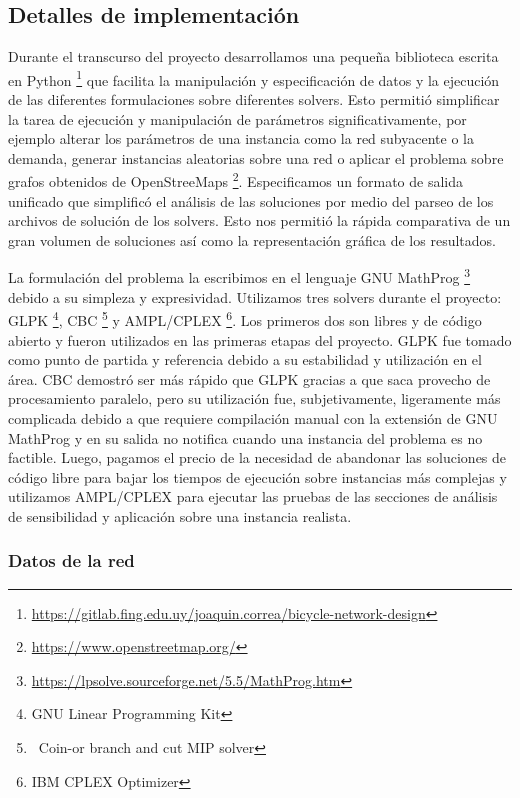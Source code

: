 \documentclass{article}
\begin{document}
  \subsection{Detalles de implementación}

  Durante el transcurso del proyecto desarrollamos una pequeña biblioteca escrita en Python \footnote{\url{https://gitlab.fing.edu.uy/joaquin.correa/bicycle-network-design}} que facilita la manipulación y especificación de datos y la ejecución de las diferentes formulaciones sobre diferentes solvers. Esto permitió simplificar la tarea de ejecución y manipulación de parámetros significativamente, por ejemplo alterar los parámetros de una instancia como la red subyacente o la demanda, generar instancias aleatorias sobre una red o aplicar el problema sobre grafos obtenidos de OpenStreeMaps \footnote{\url{https://www.openstreetmap.org/}}. Especificamos un formato de salida unificado que simplificó el análisis de las soluciones por medio del parseo de los archivos de solución de los solvers. Esto nos permitió la rápida comparativa de un gran volumen de soluciones así como la representación gráfica de los resultados.

  La formulación del problema la escribimos en el lenguaje GNU MathProg \footnote{\url{https://lpsolve.sourceforge.net/5.5/MathProg.htm}} debido a su simpleza y expresividad. Utilizamos tres solvers durante el proyecto: GLPK \footnote{GNU Linear Programming Kit}, CBC \footnote{\ Coin-or branch and cut MIP solver} y AMPL/CPLEX \footnote{IBM CPLEX Optimizer}. Los primeros dos son libres y de código abierto y fueron utilizados en las primeras etapas del proyecto. GLPK fue tomado como punto de partida y referencia debido a su estabilidad y utilización en el área. CBC demostró ser más rápido que GLPK gracias a que saca provecho de procesamiento paralelo, pero su utilización fue, subjetivamente, ligeramente más complicada debido a que requiere compilación manual con la extensión de GNU MathProg y en su salida no notifica cuando una instancia del problema es no factible. Luego, pagamos el precio de la necesidad de abandonar las soluciones de código libre para bajar los tiempos de ejecución sobre instancias más complejas y utilizamos AMPL/CPLEX para ejecutar las pruebas de las secciones de análisis de sensibilidad y aplicación sobre una instancia realista.

  \subsubsection{Datos de la red}
  \label{sect:costcalculation}
\end{document}
